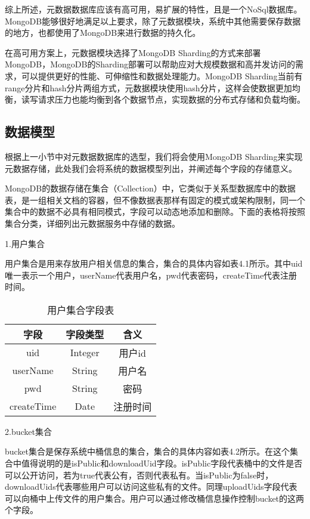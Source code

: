 综上所述，元数据数据库应该有高可用，易扩展的特性，且是一个NoSql数据库。MongoDB能够很好地满足以上要求，除了元数据模块，系统中其他需要保存数据的地方，也都使用了MongoDB来进行数据的持久化。

在高可用方案上，元数据模块选择了MongoDB Sharding的方式来部署MongoDB，MongoDB的Sharding部署可以帮助应对大规模数据和高并发访问的需求，可以提供更好的性能、可伸缩性和数据处理能力。MongoDB Sharding当前有range分片和hash分片两组方式，元数据模块使用hash分片，这样会使数据更加均衡，读写请求压力也能均衡到各个数据节点，实现数据的分布式存储和负载均衡。

\subsection{数据模型}
根据上一小节中对元数据数据库的选型，我们将会使用MongoDB Sharding来实现元数据存储，此处我们会将系统的数据模型列出，并阐述每个字段的存储意义。

MongoDB的数据存储在集合（Collection）中，它类似于关系型数据库中的数据表，是一组相关文档的容器，但不像数据表那样有固定的模式或架构限制，同一个集合中的数据不必具有相同模式，字段可以动态地添加和删除。下面的表格将按照集合分类，详细列出元数据服务中存储的数据。

1.用户集合

用户集合是用来存放用户相关信息的集合，集合的具体内容如表4.1所示。其中uid唯一表示一个用户，userName代表用户名，pwd代表密码，createTime代表注册时间。

\begin{table}[h]
    \centering
    \caption{用户集合字段表}
    \begin{tabular}{ccc}
      \toprule
      字段       & 字段类型  & 含义       \\
      \midrule
      uid        & Integer  & 用户id         \\
      userName   & String   & 用户名  \\
      pwd        & String   & 密码  \\
      createTime & Date     & 注册时间  \\
      \bottomrule
    \end{tabular}
\end{table}


2.bucket集合

bucket集合是保存系统中桶信息的集合，集合的具体内容如表4.2所示。在这个集合中值得说明的是isPublic和downloadUid字段。isPublic字段代表桶中的文件是否可以公开访问，若为true代表公有，否则代表私有。当isPublic为false时，downloadUids代表哪些用户可以访问这些私有的文件。同理uploadUids字段代表可以向桶中上传文件的用户集合。用户可以通过修改桶信息操作控制bucket的这两个字段。

